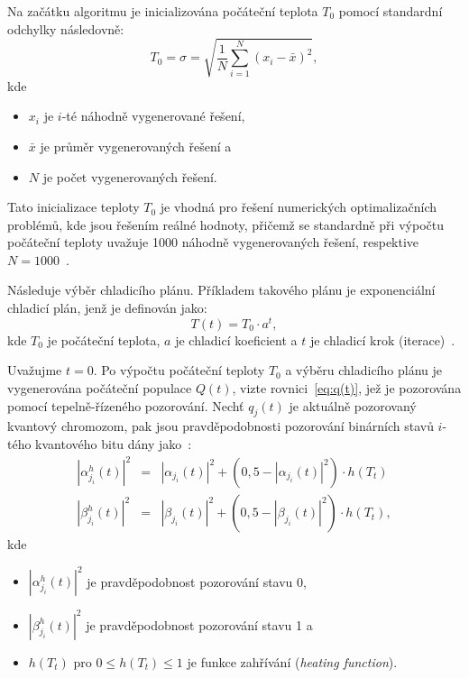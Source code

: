 Na začátku algoritmu je inicializována počáteční teplota $T_0$ pomocí standardní odchylky následovně:
\begin{equation}\label{eq:qisa-T0}
    T_0 = \sigma = \sqrt{\frac{1}{N}\sum_{i=1}^{N}\left(x_i - \bar{x}\right)^2},
\end{equation}
kde
\begin{itemize}
    \item $x_i$ je $i$-té náhodně vygenerované řešení,
    \item $\bar{x}$ je průměr vygenerovaných řešení a
    \item $N$ je počet vygenerovaných řešení.
\end{itemize}
Tato inicializace teploty $T_0$ je vhodná pro řešení numerických optimalizačních problémů, kde jsou řešením reálné hodnoty, přičemž se standardně při výpočtu počáteční teploty uvažuje 1000 náhodně vygenerovaných řešení, respektive $N=1000$~\cite{qisa,FundamentalsOfProbability}.

Následuje výběr chladicího plánu. Příkladem takového plánu je exponenciální chladicí plán, jenž je definován jako:
\begin{equation*}
    T\left(t\right) = T_0 \cdot a^t,
\end{equation*}
kde $T_0$ je počáteční teplota, $a$ je chladicí koeficient a $t$ je chladicí krok (iterace)~\cite{qisa}. 

Uvažujme $t= 0$. Po výpočtu počáteční teploty $T_0$ a výběru chladicího plánu je vygenerována počáteční populace $Q\left(t\right)$, vizte rovnici~\ref{eq:q(t)}, jež je pozorována pomocí tepelně-řízeného pozorování. 
Nechť $q_j\left(t\right)$ je aktuálně pozorovaný kvantový chromozom, pak jsou pravděpodobnosti pozorování binárních stavů $i$-tého kvantového bitu dány jako~\cite{qisa}:
\begin{eqnarray*}
    \left|\alpha_{j_i}^h\left(t\right)\right|^2 &=& \left|\alpha_{j_i}\left(t\right)\right|^2 + \left(0,5 - \left|\alpha_{j_i}\left(t\right)\right|^2\right) \cdot h\left(T_t\right) \\
    \left|\beta_{j_i}^h\left(t\right) \right|^2 &=& \left|\beta_{j_i}\left(t\right) \right|^2 + \left(0,5 - \left|\beta_{j_i}\left(t\right) \right|^2\right) \cdot h\left(T_t\right),
\end{eqnarray*}
kde 
\begin{itemize}
    \item $\left|\alpha_{j_i}^h\left(t\right)\right|^2$ je pravděpodobnost pozorování stavu 0,
    \item $\left|\beta_{j_i}^h\left(t\right)\right|^2$ je pravděpodobnost pozorování stavu 1 a
    \item $h\left(T_t\right)$ pro $0 \leq h\left(T_t\right) \leq 1$ je funkce zahřívání (\emph{heating function}). 
\end{itemize}

